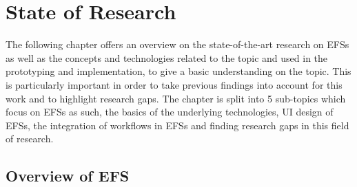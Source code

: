 \newpage
\section{State of Research} 
The following chapter offers an overview on the state-of-the-art research on \acp{EFS} as well as the concepts and technologies related to the topic and used in the prototyping and implementation, to give a basic understanding on the topic. This is particularly important in order to take previous findings into account for this work and to highlight research gaps. The chapter is split into 5 sub-topics which focus on \acp{EFS} as such, the basics of the underlying technologies, \ac{UI} design of \acp{EFS}, the integration of workflows in \acp{EFS} and finding research gaps in this field of research.

\subsection{Overview of \acl{EFS}}

